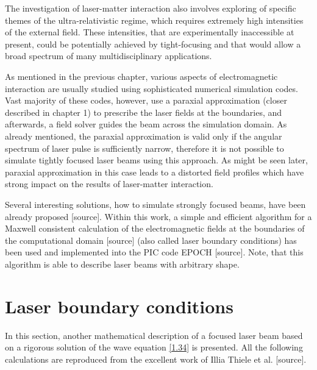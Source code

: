 The investigation of laser-matter interaction also involves exploring of specific themes of the ultra-relativistic regime, which requires extremely high intensities of the external field. These intensities, that are experimentally inaccessible at present, could be potentially achieved by tight-focusing and that would allow a broad spectrum of many multidisciplinary applications.

As mentioned in the previous chapter, various aspects of electromagnetic interaction are usually studied using sophisticated numerical simulation codes. Vast majority of these codes, however, use a paraxial approximation (closer described in chapter 1) to prescribe the laser fields at the boundaries, and afterwards, a field solver guides the beam across the simulation domain. As already mentioned, the paraxial approximation is valid only if the angular spectrum of laser pulse is sufficiently narrow, therefore it is not possible to simulate tightly focused laser beams using this approach. As might be seen later, paraxial approximation in this case leads to a distorted field profiles which have strong impact on the results of laser-matter interaction.

Several interesting solutions, how to simulate strongly focused beams, have been already proposed [source]. Within this work, a simple and efficient algorithm for a Maxwell consistent calculation of the electromagnetic fields at the boundaries of the computational domain [source] (also called laser boundary conditions) has been used and implemented into the PIC code EPOCH [source]. Note, that this algorithm is able to describe laser beams with arbitrary shape.

\section{Laser boundary conditions}
In this section, another mathematical description of a focused laser beam based on a rigorous solution of the wave equation \ref{1.34} is presented. All the following calculations are reproduced from the excellent work of Illia Thiele et al. [source]. 

